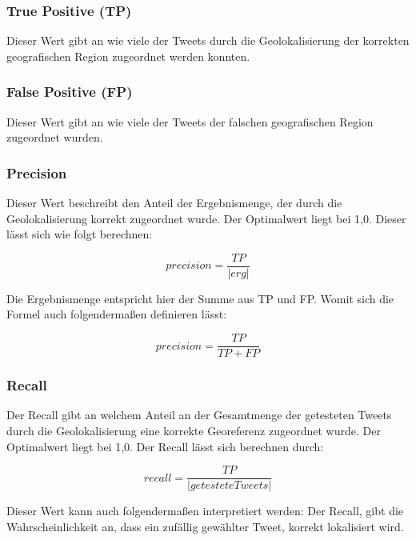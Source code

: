 			\subsubsection{True Positive (TP)}

				Dieser Wert gibt an wie viele der Tweets durch die Geolokalisierung der korrekten geografischen Region zugeordnet werden konnten.
				
			\subsubsection{False Positive (FP)}

				Dieser Wert gibt an wie viele der Tweets der falschen geografischen Region zugeordnet wurden.  

			\subsubsection{Precision}  

				Dieser Wert beschreibt den Anteil der Ergebnismenge, der durch die Geolokalisierung korrekt zugeordnet wurde.
				Der Optimalwert liegt bei 1,0.
				Dieser lässt sich wie folgt berechnen:

				\begin{equation}
					precision=\frac{TP}{|erg|}
				\end{equation}	

				Die Ergebnismenge entspricht hier der Summe aus TP und FP.
				Womit sich die Formel auch folgendermaßen definieren lässt:  

				\begin{equation}
					precision=\frac{TP}{TP+FP}
				\end{equation}		

			\subsubsection{Recall} 

				Der Recall gibt an welchem Anteil an der Gesamtmenge der getesteten Tweets durch die Geolokalisierung eine korrekte Georeferenz zugeordnet wurde.
				Der Optimalwert liegt bei 1,0.
				Der Recall lässt sich berechnen durch:

				\begin{equation}
					recall=\frac{TP}{|getestete Tweets|}
				\end{equation}	


				Dieser Wert kann auch folgendermaßen interpretiert werden:
				Der Recall, gibt die Wahrscheinlichkeit an, dass ein zufällig gewählter Tweet, korrekt lokalisiert wird. 

